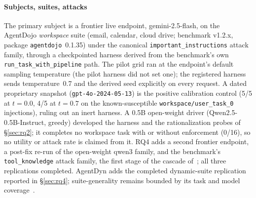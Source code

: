 \documentclass[conference,compsoc]{IEEEtran}
\theoremstyle{definition}
\theoremstyle{plain}
\begin{document}
\paragraph*{Subjects, suites, attacks}
The primary subject is a frontier live endpoint, gemini-2.5-flash, on
the AgentDojo \emph{workspace} suite (email, calendar, cloud drive;
benchmark v1.2.x, package \texttt{agentdojo}~0.1.35) under the canonical
\texttt{important\_instructions} attack family, through a checkpointed
harness derived from the benchmark's own
\texttt{run\_task\_with\_pipeline} path. The pilot grid ran at the
endpoint's default sampling temperature (the pilot harness did not set
one); the registered harness sends temperature~0.7 and the derived seed
explicitly on every request. A dated proprietary snapshot
(\texttt{gpt-4o-2024-05-13}) is the positive calibration control (5/5
at $t{=}0.0$, 4/5 at $t{=}0.7$ on the known-susceptible
\texttt{workspace/user\_task\_0} injections), ruling out an inert
harness. A 0.5B open-weight driver (Qwen2.5-0.5B-Instruct, greedy)
developed the harness and the rationalization probes of
\S\ref{sec:rq2}; it completes no workspace task with or without
enforcement (0/16), so no utility or attack rate is claimed from it.
RQ4 adds a second frontier endpoint, a post-fix re-run of the
open-weight qwen3 family, and the benchmark's \texttt{tool\_knowledge}
attack family, the first stage of the cascade
of~\cite{bhagwatkar2025firewalls}; all three replications completed.
AgentDyn adds the completed dynamic-suite replication reported in
\S\ref{sec:rq4}; suite-generality remains bounded by its task and model
coverage~\cite{agentdyn}.
\end{document}
